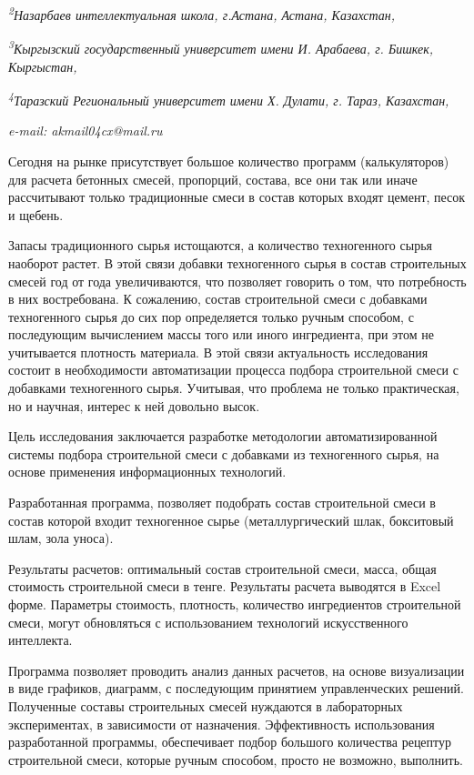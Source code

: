 \documentclass[
]{article}
\begin{document}
\emph{\textsuperscript{2}Назарбаев интеллектуальная школа, г.Астана,
Астана, Казахстан,}

\emph{\textsuperscript{3}Кыргызский государственный университет имени И.
Арабаева, г. Бишкек, Кыргыстан,}

\emph{\textsuperscript{4}Таразский Региональный университет имени Х.
Дулати, г. Тараз, Казахстан,}

\emph{e-mail: akmail04cx@mail.ru}

Сегодня на рынке присутствует большое количество программ
(калькуляторов) для расчета бетонных смесей, пропорций, состава, все они
так или иначе рассчитывают только традиционные смеси в состав которых
входят цемент, песок и щебень.

Запасы традиционного сырья истощаются, а количество техногенного сырья
наоборот растет. В этой связи добавки техногенного сырья в состав
строительных смесей год от года увеличиваются, что позволяет говорить о
том, что потребность в них востребована. К сожалению, состав
строительной смеси с добавками техногенного сырья до сих пор
определяется только ручным способом, с последующим вычислением массы
того или иного ингредиента, при этом не учитывается плотность материала.
В этой связи актуальность исследования состоит в необходимости
автоматизации процесса подбора строительной смеси с добавками
техногенного сырья. Учитывая, что проблема не только практическая, но и
научная, интерес к ней довольно высок.

Цель исследования заключается разработке методологии автоматизированной
системы подбора строительной смеси с добавками из техногенного сырья, на
основе применения информационных технологий.

Разработанная программа, позволяет подобрать состав строительной смеси в
состав которой входит техногенное сырье (металлургический шлак,
бокситовый шлам, зола уноса).

Результаты расчетов: оптимальный состав строительной смеси, масса, общая
стоимость строительной смеси в тенге. Результаты расчета выводятся в
Excel форме. Параметры стоимость, плотность, количество ингредиентов
строительной смеси, могут обновляться с использованием технологий
искусственного интеллекта.

Программа позволяет проводить анализ данных расчетов, на основе
визуализации в виде графиков, диаграмм, с последующим принятием
управленческих решений. Полученные составы строительных смесей нуждаются
в лабораторных экспериментах, в зависимости от назначения. Эффективность
использования разработанной программы, обеспечивает подбор большого
количества рецептур строительной смеси, которые ручным способом, просто
не возможно, выполнить.
\end{document}
